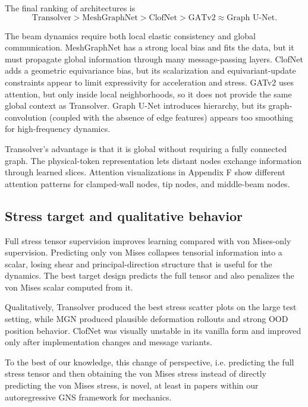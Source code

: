 \documentclass[11pt,a4paper,reqno]{amsart}
\theoremstyle{definition}
\theoremstyle{remark}
\numberwithin{equation}{section}
\begin{document}
The final ranking of architectures is
\begin{equation}
    \text{Transolver} > \text{MeshGraphNet} > \text{ClofNet} > \text{GATv2}\approx\text{Graph U-Net}.
\end{equation}

The beam dynamics require both local elastic consistency and global communication. MeshGraphNet has a strong local bias and fits the data, but it must propagate global information through many message-passing layers. ClofNet adds a geometric equivariance bias, but its scalarization and equivariant-update constraints appear to limit expressivity for acceleration and stress. GATv2 uses attention, but only inside local neighborhoods, so it does not provide the same global context as Transolver. Graph U-Net introduces hierarchy, but its graph-convolution (coupled with the absence of edge features) appears too smoothing for high-frequency dynamics.

Transolver's advantage is that it is global without requiring a fully connected graph. The physical-token representation lets distant nodes exchange information through learned slices. Attention visualizations in Appendix F show different attention patterns for clamped-wall nodes, tip nodes, and middle-beam nodes. 

\subsection{Stress target and qualitative behavior}

Full stress tensor supervision improves learning compared with von Mises-only supervision. Predicting only von Mises collapses tensorial information into a scalar, losing shear and principal-direction structure that is useful for the dynamics. The best target design predicts the full tensor and also penalizes the von Mises scalar computed from it. 

Qualitatively, Transolver produced the best stress scatter plots on the large test setting, while MGN produced plausible deformation rollouts and strong OOD position behavior. ClofNet was visually unstable in its vanilla form and improved only after implementation changes and message variants. 

To the best of our knowledge, this change of perspective, i.e. predicting the full stress tensor and then obtaining the von Mises stress instead of directly predicting the von Mises stress, is novel, at least in papers within our autoregressive GNS framework for mechanics.
\end{document}
